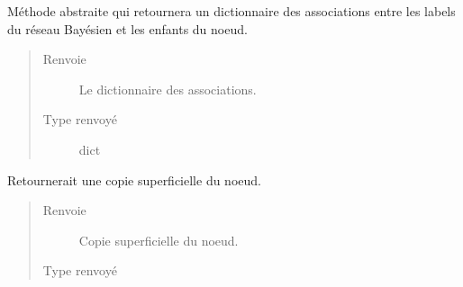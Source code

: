 \documentclass[letterpaper,10pt,french]{sphinxmanual}
\begin{document}
\begin{fulllineitems}
\begin{fulllineitems}
\end{fulllineitems}


\begin{fulllineitems}
\label{\detokenize{index:StrategyTree.NodeST.bn_labels_children_association}}
Méthode abstraite qui retournera un dictionnaire des associations entre
les labels du réseau Bayésien et les enfants du noeud.
\begin{quote}\begin{description}
\item[{Renvoie}] \leavevmode
{} \textendash{} Le dictionnaire des associations.

\item[{Type renvoyé}] \leavevmode
dict

\end{description}\end{quote}

\end{fulllineitems}


\begin{fulllineitems}
\label{\detokenize{index:StrategyTree.NodeST.copy}}
Retournerait une copie superficielle du noeud.
\begin{quote}\begin{description}
\item[{Renvoie}] \leavevmode
{} \textendash{} Copie superficielle du noeud.

\item[{Type renvoyé}] \leavevmode
{\hyperref[\detokenize{index:StrategyTree.NodeST}]{}}

\end{description}\end{quote}

\end{fulllineitems}



\end{fulllineitems}
\end{document}
